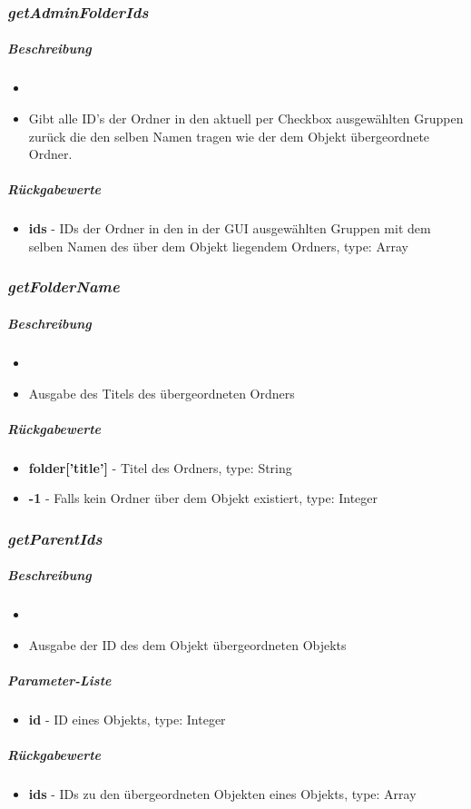 \subsubsection*{\textit{getAdminFolderIds}}\label{getAdminFolderIdsLGUI}
\subparagraph{Beschreibung}
\begin{itemize}
	\item[] \noindent{} 
	\item[] Gibt alle ID's der Ordner in den aktuell per Checkbox ausgewählten Gruppen zurück die den selben Namen tragen wie der dem Objekt übergeordnete Ordner.
\end{itemize}
\subparagraph{Rückgabewerte}
\begin{itemize}
	\item[] \textbf{ids} - IDs der Ordner in den in der GUI ausgewählten Gruppen mit dem selben Namen des über dem Objekt liegendem Ordners, type: Array
\end{itemize}

\subsubsection*{\textit{getFolderName}}\label{getFolderNameLGUI}
\subparagraph{Beschreibung}
\begin{itemize}
	\item[] \noindent{} 
	\item[] Ausgabe des Titels des übergeordneten Ordners
\end{itemize}
\subparagraph{Rückgabewerte}
\begin{itemize}
	\item[] \textbf{folder['title']} - Titel des Ordners, type: String 
	\item[] \textbf{-1} - Falls kein Ordner über dem Objekt existiert, type: Integer
\end{itemize}

\subsubsection*{\textit{getParentIds}}\label{getParentIdsLGUI}
\subparagraph{Beschreibung}
\begin{itemize}
	\item[] \noindent{} 
	\item[] Ausgabe der ID des dem Objekt übergeordneten Objekts
\end{itemize}
\subparagraph{Parameter-Liste}
\begin{itemize}
	\item[] \textbf{id} - ID eines Objekts, type: Integer 
\end{itemize}
\subparagraph{Rückgabewerte}
\begin{itemize}
	\item[] \textbf{ids} - IDs zu den übergeordneten Objekten eines Objekts, type: Array
\end{itemize}

